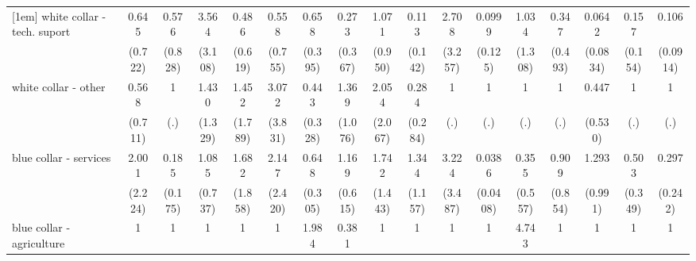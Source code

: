 {\begin{tabular}{l*{16}{c}}
[1em]
white collar - tech. suport&       0.645         &       0.576         &       3.564         &       0.486         &       0.558         &       0.658         &       0.273         &       1.071         &       0.113         &       2.708         &      0.0999         &       1.034         &       0.347         &      0.0642\sym{*}  &       0.157         &       0.106\sym{**} \\
                    &     (0.722)         &     (0.828)         &     (3.108)         &     (0.619)         &     (0.755)         &     (0.395)         &     (0.367)         &     (0.950)         &     (0.142)         &     (3.257)         &     (0.125)         &     (1.308)         &     (0.493)         &    (0.0834)         &     (0.154)         &    (0.0914)         \\
[1em]
white collar - other&       0.568         &           1         &       1.430         &       1.452         &       3.072         &       0.443         &       1.369         &       2.054         &       0.284         &           1         &           1         &           1         &           1         &       0.447         &           1         &           1         \\
                    &     (0.711)         &         (.)         &     (1.329)         &     (1.789)         &     (3.831)         &     (0.328)         &     (1.076)         &     (2.067)         &     (0.284)         &         (.)         &         (.)         &         (.)         &         (.)         &     (0.530)         &         (.)         &         (.)         \\
[1em]
blue collar - services&       2.001         &       0.185         &       1.085         &       1.682         &       2.147         &       0.648         &       1.169         &       1.742         &       1.344         &       3.224         &      0.0386\sym{**} &       0.355         &       0.909         &       1.293         &       0.503         &       0.297         \\
                    &     (2.224)         &     (0.175)         &     (0.737)         &     (1.858)         &     (2.420)         &     (0.305)         &     (0.615)         &     (1.443)         &     (1.157)         &     (3.487)         &    (0.0408)         &     (0.557)         &     (0.854)         &     (0.991)         &     (0.349)         &     (0.242)         \\
[1em]
blue collar - agriculture&           1         &           1         &           1         &           1         &           1         &       1.984         &       0.381         &           1         &           1         &           1         &           1         &       4.743         &           1         &           1         &           1         &           1         \\

\end{tabular}}
